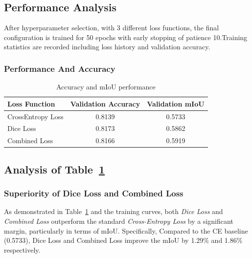 \subsection{Performance Analysis}
After hyperparameter selection, with 3 different loss functions, the final configuration is trained for 50 epochs with early stopping of patience 10.Training statistics are recorded including loss history and validation accuracy.
\subsubsection{Performance And Accuracy}
\begin{table}[H]
\centering
\caption{Accuracy and mIoU performance}
\label{tab:loss_ablation}
\begin{tabular}{l c c} %
\toprule
Loss Function & Validation Accuracy & Validation mIoU \\
\midrule
CrossEntropy Loss & 0.8139 & 0.5733 \\ %
Dice Loss & 0.8173 & 0.5862 \\
Combined Loss & 0.8166 & 0.5919 \\ %
\bottomrule
\end{tabular}
\end{table}

\subsection{Analysis of Table~\ref{tab:loss_ablation}}
\subsubsection{Superiority of Dice Loss and Combined Loss}
As demonstrated in Table~\ref{tab:loss_ablation} and the training curves, both \textit{Dice Loss} and \textit{Combined Loss} outperform the standard \textit{Cross-Entropy Loss} by a significant margin, particularly in terms of mIoU. Specifically, Compared to the CE baseline (0.5733), Dice Loss and Combined Loss improve the mIoU by 1.29\% and 1.86\% respectively. 

